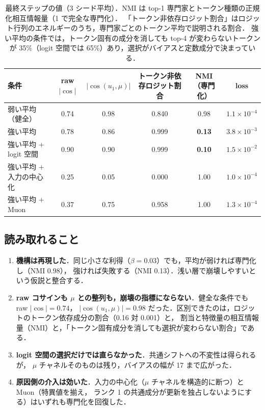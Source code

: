 \documentclass[a4paper,11pt]{ltjsarticle}
\theoremstyle{definition}
\theoremstyle{plain}
\begin{document}
\begin{table}[h]
\centering\footnotesize
\begin{tabular}{@{}lccccc@{}}
\toprule
条件 & raw $|\cos|$ & $|\cos(u_1,\mu)|$ & トークン非依存ロジット割合 & NMI（専門化） & loss \\ \midrule
弱い平均（健全）           & 0.74 & 0.98 & 0.840 & 0.98 & $1.1\times10^{-4}$ \\
強い平均                   & 0.78 & 0.86 & 0.999 & \textbf{0.13} & $3.8\times10^{-3}$ \\
強い平均 + logit 空間       & 0.90 & 0.90 & 0.999 & \textbf{0.10} & $1.5\times10^{-2}$ \\
強い平均 + 入力の中心化     & 0.25 & 0.05 & 0.000 & 1.00 & $1.0\times10^{-4}$ \\
強い平均 + Muon            & 0.37 & 0.75 & 0.958 & 1.00 & $1.3\times10^{-4}$ \\
\bottomrule
\end{tabular}
\caption{最終ステップの値（3 シード平均）．NMI は top-1 専門家とトークン種類の正規化相互情報量（1 で完全な専門化）．
「トークン非依存ロジット割合」はロジット行列のエネルギーのうち，専門家ごとのトークン平均で説明される割合．
強い平均の条件では，トークン固有の成分を消しても top-4 が変わらないトークンが 35\%（logit 空間では 65\%）あり，選択がバイアスと定数成分で決まっている．}
\label{tab:toy}
\end{table}

\subsection{読み取れること}
\begin{enumerate}[leftmargin=*]
\item \textbf{機構は再現した}．同じ小さな利得（$\beta=0.03$）でも，平均が弱ければ専門化し（NMI 0.98），
  強ければ失敗する（NMI 0.13）．浅い層で崩壊しやすいという仮説と整合する．
\item \textbf{raw コサインも $\mu$ との整列も，崩壊の指標にならない}．健全な条件でも raw $|\cos|=0.74$，
  $|\cos(u_1,\mu)|=0.98$ だった．区別できたのは，ロジットのトークン依存成分の割合（0.16 対 0.001）と，
  割当と特徴量の相互情報量（NMI）と，「トークン固有成分を消しても選択が変わらない割合」である．
\item \textbf{logit 空間の選択だけでは直らなかった}．共通シフトへの不変性は得られるが，
  $\mu$ チャネルそのものは残り，バイアスの幅が 17 まで広がった．
\item \textbf{原因側の介入は効いた}．入力の中心化（$\mu$ チャネルを構造的に断つ）と Muon（特異値を揃え，
  ランク 1 の共通成分が更新を独占しないようにする）はいずれも専門化を回復した．
\end{enumerate}
\end{document}
